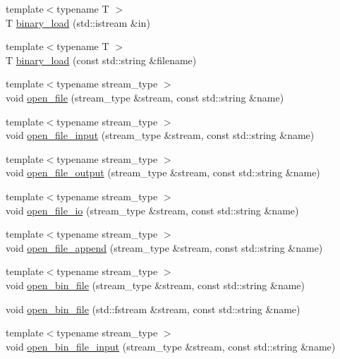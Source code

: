 \begin{DoxyCompactItemize}
{\footnotesize template$<$typename T $>$ }\\T \hyperlink{namespaceIceBRG_a1b7650b6041017d3000f92c16bbe1624}{binary\-\_\-load} (std\-::istream \&in)
\item 
{\footnotesize template$<$typename T $>$ }\\T \hyperlink{namespaceIceBRG_a62821f1be451ec92aa181b8a1780fb57}{binary\-\_\-load} (const std\-::string \&filename)
\item 
{\footnotesize template$<$typename stream\-\_\-type $>$ }\\void \hyperlink{namespaceIceBRG_a5b4ac3464869824e71dfa81466ec2928}{open\-\_\-file} (stream\-\_\-type \&stream, const std\-::string \&name)
\item 
{\footnotesize template$<$typename stream\-\_\-type $>$ }\\void \hyperlink{namespaceIceBRG_a6efe96f7b5966041c9a2340e7b905a0e}{open\-\_\-file\-\_\-input} (stream\-\_\-type \&stream, const std\-::string \&name)
\item 
{\footnotesize template$<$typename stream\-\_\-type $>$ }\\void \hyperlink{namespaceIceBRG_a449b2c7b749810a767c3debbcfc3f623}{open\-\_\-file\-\_\-output} (stream\-\_\-type \&stream, const std\-::string \&name)
\item 
{\footnotesize template$<$typename stream\-\_\-type $>$ }\\void \hyperlink{namespaceIceBRG_a04052c6797231d6de214b714a9cc91de}{open\-\_\-file\-\_\-io} (stream\-\_\-type \&stream, const std\-::string \&name)
\item 
{\footnotesize template$<$typename stream\-\_\-type $>$ }\\void \hyperlink{namespaceIceBRG_aaca651220c0f96240a39b6195092b360}{open\-\_\-file\-\_\-append} (stream\-\_\-type \&stream, const std\-::string \&name)
\item 
{\footnotesize template$<$typename stream\-\_\-type $>$ }\\void \hyperlink{namespaceIceBRG_a1636a432cee12f68613153e766cc12c3}{open\-\_\-bin\-\_\-file} (stream\-\_\-type \&stream, const std\-::string \&name)
\item 
void \hyperlink{namespaceIceBRG_a88b24096fcbca74385c3cce8cb6465df}{open\-\_\-bin\-\_\-file} (std\-::fstream \&stream, const std\-::string \&name)
\item 
{\footnotesize template$<$typename stream\-\_\-type $>$ }\\void \hyperlink{namespaceIceBRG_a9edd83707395d401d3156f92c00180bb}{open\-\_\-bin\-\_\-file\-\_\-input} (stream\-\_\-type \&stream, const std\-::string \&name)

\end{DoxyCompactItemize}
